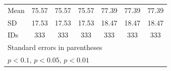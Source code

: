 \begin{table}[htbp]
\begin{tabular}{l*{6}{c}}
\hline
Mean                            &    75.57         &    75.57         &    75.57         &    77.39         &    77.39         &    77.39         \\
SD                              &    17.53         &    17.53         &    17.53         &    18.47         &    18.47         &    18.47         \\
IDs                             &      333         &      333         &      333         &      333         &      333         &      333         \\
\hline\hline
\multicolumn{7}{l}{\footnotesize Standard errors in parentheses}\\
\multicolumn{7}{l}{\footnotesize \sym{*} \(p<0.1\), \sym{**} \(p<0.05\), \sym{***} \(p<0.01\)}\\
\end{tabular}
\end{table}
